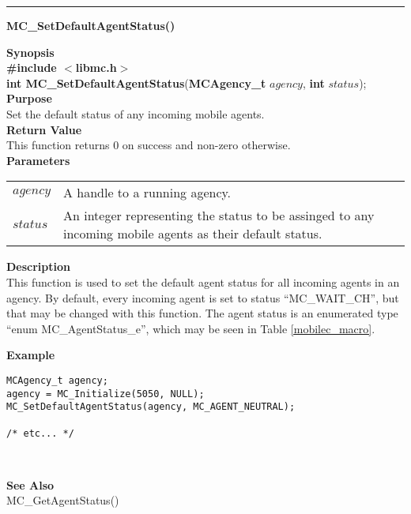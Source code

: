 \noindent
\vspace{5pt}
\rule{6.5in}{0.015in}
\noindent
{\LARGE \bf MC\_SetDefaultAgentStatus()}\\
{}
\label{api:MC_SetDefaultAgentStatus()}

\noindent
{\bf Synopsis}\\
{\bf \#include $<$libmc.h$>$}\\
{\bf int MC\_SetDefaultAgentStatus}({\bf MCAgency\_t} $agency$, {\bf int} $status$);\\

\noindent
{\bf Purpose}\\
Set the default status of any incoming mobile agents.\\

\noindent
{\bf Return Value}\\
This function returns 0 on success and non-zero otherwise.\\

\noindent
{\bf Parameters}
\vspace{-0.1in}
\begin{description}
\item               
\begin{tabular}{p{10 mm}p{145 mm}}
$agency$ & A handle to a running agency.\\
$status$ & An integer representing the status to be assinged to any incoming 
mobile agents as their default status.
\end{tabular}
\end{description}

\noindent
{\bf Description}\\
This function is used to set the default agent status for all incoming
agents in an agency. By default, every incoming agent is set to status
``MC\_WAIT\_CH'', but that may be changed with this function.
The agent status is an enumerated type ``enum MC\_AgentStatus\_e'', which
may be seen in Table \vref{mobilec_macro}.

\noindent
{\bf Example}\\
\begin{verbatim}
MCAgency_t agency;
agency = MC_Initialize(5050, NULL);
MC_SetDefaultAgentStatus(agency, MC_AGENT_NEUTRAL);

/* etc... */
\end{verbatim}\\
\noindent

\noindent
{\bf See Also}\\
MC\_GetAgentStatus()

